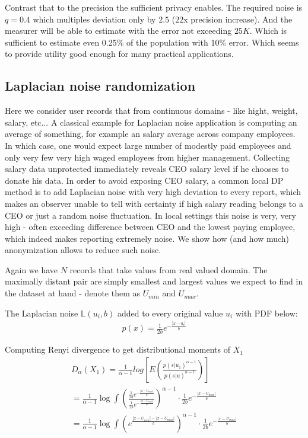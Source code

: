\documentclass[11pt]{article}
\begin{document}
Contrast that to the precision the sufficient privacy enables.  The required noise is $q=0.4$ which multiples deviation only by $2.5$ ($22$x precision increase).  And the measurer will be able to estimate with the error not exceeding $25K$.  Which is  sufficient to estimate even 0.25\% of the population with 10\% error.  Which seems to provide utility good enough for  many practical applications.

\subsection{Laplacian noise randomization}
Here we consider user records that from continuous domains - like hight, weight, salary, etc...  A classical example for Laplacian noise application is computing an average of something, for example an salary average across company employees.  In which case, one would expect large number of modestly paid employees and only very few very high waged employees from higher management.  Collecting salary data unprotected immediately reveals CEO salary level if he chooses to donate his data.  In order to avoid exposing CEO salary, a common local DP method is to add Laplacian noise with very high deviation to every report, which makes an observer unable to tell with certainty if high salary reading belongs to a CEO or just a random noise fluctuation.  In local settings this noise is very, very high - often exceeding difference between CEO and the lowest paying employee, which indeed makes reporting extremely noise.  We show how (and how much) anonymization allows to reduce such noise.

Again we have $N$ records that take values from real valued domain.   The maximally distant pair are simply smallest and largest values we expect to find in the dataset at hand - denote them as $U_{min}$ and $U_{max}$.

The  Laplacian noise $\mathbb{L}(u_i,b)$ added to every original value $u_i$ with PDF below:
 \begin{align}
  p(x) = \frac{1}{2b}e^{-\frac{| x - u_i|}{b}}  
\end{align}
 
Computing Renyi divergence to get distributional moments of $X_1$
\begin{align}
 D_{\alpha} (X_1) =   \frac{1}{\alpha - 1} log  \left [ E \left ( \frac{p(s|u_1)^{\alpha-1}}{ p(s|u)^{\alpha-1} } \right ) \right ]  \\
 = \frac{1}{\alpha - 1} \log \int \left ( \frac{\frac{1}{2b}e^{-\frac{| x - U_{max}|}{b}}} {  \frac{1}{2b}e^{-\frac{| x - U_{min}|}{b}} } \right )^{\alpha-1}   \cdot \frac{1}{2b}e^{-\frac{| x - U_{max}|}{b}} \\
 =  \frac{1}{\alpha - 1} \log \int  \left (  e^{\frac{| x - U_{min}| - | x - U_{max}|}{b}}  \right )^{\alpha-1}   \cdot \frac{1}{2b}e^{-\frac{| x - U_{max}|}{b}}
 \end{align}
\end{document}
